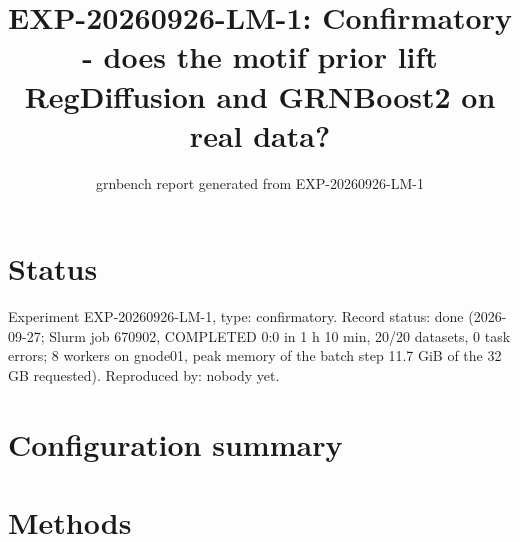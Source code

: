 \documentclass{article}
\title{EXP-20260926-LM-1: Confirmatory - does the motif prior lift RegDiffusion and GRNBoost2 on real data?}
\author{grnbench report generated from EXP-20260926-LM-1}
\date{}
\begin{document}
\maketitle
\section*{Status}
Experiment EXP-20260926-LM-1, type: confirmatory. Record status: done (2026-09-27; Slurm job 670902, COMPLETED 0:0 in 1 h 10 min, 20/20 datasets, 0 task errors; 8 workers on gnode01, peak memory of the batch step 11.7 GiB of the 32 GB requested). Reproduced by: nobody yet.
\section{Configuration summary}

\section{Methods}
\end{document}
